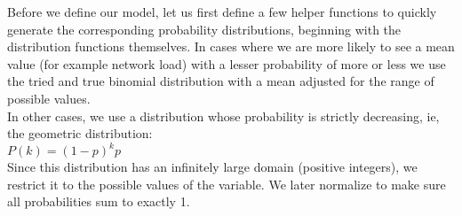 \documentclass[11pt]{article}
\begin{document}
    Before we define our model, let us first define a few helper functions
to quickly generate the corresponding probability distributions,
beginning with the distribution functions themselves. In cases where we
are more likely to see a mean value (for example network load) with a
lesser probability of more or less we use the tried and true binomial
distribution with a mean adjusted for the range of possible values.\\
In other cases, we use a distribution whose probability is strictly
decreasing, ie, the geometric distribution:\\
\(P(k)=(1-p)^kp\)\\
Since this distribution has an infinitely large domain (positive
integers), we restrict it to the possible values of the variable. We
later normalize to make sure all probabilities sum to exactly 1.
\end{document}
